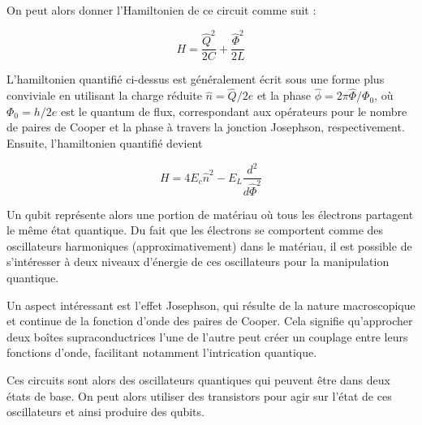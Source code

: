 \documentclass{article}
\begin{document}
\begin{multicols}{2}
On peut alors donner l'Hamiltonien de ce circuit comme suit :

$$
H = \frac{{\hat{Q}^2}}{{2C}} + \frac{{\hat{\Phi}^2}}{{2L}}
$$

L'hamiltonien quantifié ci-dessus est généralement écrit sous une forme plus conviviale en utilisant la charge réduite $\hat{n}=\hat{Q}/2e$ et la phase $\hat{\phi}=2\pi\hat{\Phi}/\Phi_0$, où $\Phi_0=h/2e$ est le quantum de flux, correspondant aux opérateurs pour le nombre de paires de Cooper et la phase à travers la jonction Josephson, respectivement. Ensuite, l'hamiltonien quantifié devient

$$
H = 4E_c\hat{n}^2 - E_L\frac{d^2}{d\hat{\Phi}^2}
$$


Un qubit représente alors une portion de matériau où tous les électrons partagent le même état quantique.
Du fait que les électrons se comportent comme des oscillateurs harmoniques (approximativement) dans le matériau, il est possible de s'intéresser à deux niveaux d'énergie de ces oscillateurs pour la manipulation quantique.

Un aspect intéressant est l'effet Josephson, qui résulte de la nature macroscopique et continue de la fonction d'onde des paires de Cooper. Cela signifie qu'approcher deux boîtes supraconductrices l'une de l'autre peut créer un couplage entre leurs fonctions d'onde, facilitant notamment l'intrication quantique.



Ces circuits sont alors des oscillateurs quantiques qui peuvent être dans deux états de base.
On peut alors utiliser des transistors pour agir sur l'état de ces oscillateurs et ainsi produire des qubits.


\end{multicols}
\end{document}
